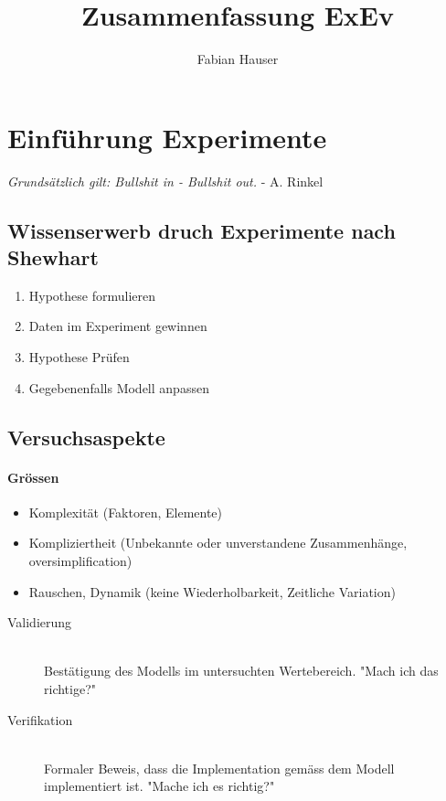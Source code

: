 

\title{Zusammenfassung ExEv}
\author{Fabian Hauser}
 

\maketitle

\section{Einführung Experimente}

\emph{Grundsätzlich gilt: Bullshit in - Bullshit out.} - A. Rinkel

\subsection{Wissenserwerb druch Experimente nach Shewhart}
\begin{enumerate}
	\item	Hypothese formulieren
	\item	Daten im Experiment gewinnen
	\item	Hypothese Prüfen
	\item	Gegebenenfalls Modell anpassen
\end{enumerate}

\subsection{Versuchsaspekte}
\paragraph{Grössen}
\begin{itemize}
	\item	Komplexität			(Faktoren, Elemente)
	\item	Kompliziertheit		(Unbekannte oder unverstandene Zusammenhänge, oversimplification)
	\item	Rauschen, Dynamik	(keine Wiederholbarkeit, Zeitliche Variation)
\end{itemize}

\begin{description}
	\item[Validierung] \hfill \\
		Bestätigung des Modells im untersuchten Wertebereich. "Mach ich das richtige?"
	\item[Verifikation] \hfill \\
		Formaler Beweis, dass die Implementation gemäss dem Modell implementiert ist. "Mache ich es richtig?"
\end{description}

